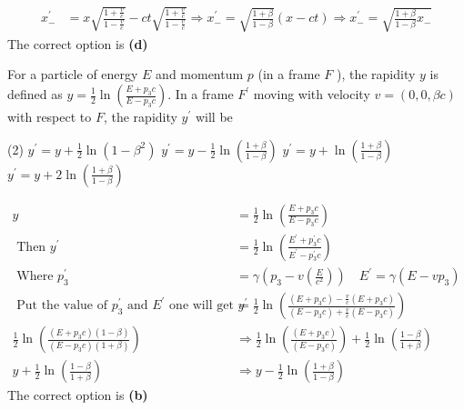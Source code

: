 \begin{enumerate}
\begin{answer}
\begin{align*}
x_{-}^{\prime}&=x \sqrt{\frac{1+\frac{v}{c}}{1-\frac{v}{c}}}-c t \sqrt{\frac{1+\frac{v}{c}}{1-\frac{v}{c}}} \Rightarrow x_{-}^{\prime}=\sqrt{\frac{1+\beta}{1-\beta}}(x-c t) \Rightarrow x_{-}^{\prime}=\sqrt{\frac{1+\beta}{1-\beta} x_{-}}
\end{align*}
The correct option is \textbf{(d)}	
\end{answer}
\begin{minipage}{\textwidth}
	\item For a particle of energy $E$ and momentum $p$ (in a frame $F$ ), the rapidity $y$ is defined as $y=\frac{1}{2} \ln \left(\frac{E+p_{3} c}{E-p_{3} c}\right) .$ In a frame $F^{\prime}$ moving with velocity $v=(0,0, \beta c)$ with respect to $F$, the rapidity $y^{\prime}$ will be
\end{minipage}
\begin{tasks}(2)
	\task[\textbf{A.}] $y^{\prime}=y+\frac{1}{2} \ln \left(1-\beta^{2}\right)$
	\task[\textbf{B.}]$y^{\prime}=y-\frac{1}{2} \ln \left(\frac{1+\beta}{1-\beta}\right)$
	\task[\textbf{C.}]$y^{\prime}=y+\ln \left(\frac{1+\beta}{1-\beta}\right)$
	\task[\textbf{D.}]$y^{\prime}=y+2 \ln \left(\frac{1+\beta}{1-\beta}\right)$
\end{tasks}
\begin{answer}
\begin{align*}
y&=\frac{1}{2} \ln \left(\frac{E+p_{3} c}{E-p_{3} c}\right)\\
\text { Then } y^{\prime}&=\frac{1}{2} \ln \left(\frac{E^{\prime}+p_{3}^{\prime} c}{E^{\prime}-p_{3}^{\prime} c}\right)\\
\text { Where } p_{3}^{\prime}&=\gamma\left(p_{3}-v\left(\frac{E}{c^{2}}\right)\right) \quad E^{\prime}=\gamma\left(E-v p_{3}\right)\\
\text { Put the value of } p_{3}^{\prime} \text { and } E^{\prime} \text { one will get } y^{\prime}&=\frac{1}{2} \ln \left(\frac{\left(E+p_{3} c\right)-\frac{v}{c}\left(E+p_{3} c\right)}{\left(E-p_{3} c\right)+\frac{v}{c}\left(E-p_{3} c\right)}\right)\\
\frac{1}{2} \ln \left(\frac{\left(E+p_{3} c\right)(1-\beta)}{\left(E-p_{3} c\right)(1+\beta)}\right) &\Rightarrow \frac{1}{2} \ln \left(\frac{\left(E+p_{3} c\right)}{\left(E-p_{3} c\right)}\right)+\frac{1}{2} \ln \left(\frac{1-\beta}{1+\beta}\right)\\
y+\frac{1}{2} \ln \left(\frac{1-\beta}{1+\beta}\right)& \Rightarrow y-\frac{1}{2} \ln \left(\frac{1+\beta}{1-\beta}\right)
\end{align*}
The correct option is \textbf{(b)}	

\end{answer}
\end{enumerate}
